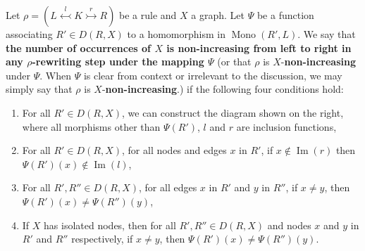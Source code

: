 \begin{definition}
    \label{subgraph_counting:def:creates_more_x_on_the_left}
    Let \(\rho = (L \overset{l}{\leftarrowtail} K \overset{r}{\rightarrowtail} R)\) be a rule and \(X\) a graph. 
    Let \( \Psi \) be a function associating $R' \in D(R,X)$ to a homomorphism in $\operatorname{Mono}(R',L)$.
    We say that \textbf{the number of occurrences of $X$ is non-increasing from left to right in any $\rho$-rewriting step under the mapping \(\Psi\)}
    (or that $\rho$ is $X$-\textbf{non-increasing} under $\Psi$. When $\Psi$ is clear from context or irrelevant to the discussion, we may simply say that $\rho$ is $X$-\textbf{non-increasing}.)
    if the following four conditions hold:
    \newline
    \vspace{1mm}
    \noindent
    \begin{minipage}{0.64\textwidth} 
    \begin{enumerate}
        \item For all $R' \in D(R,X)$, we can construct the diagram shown on the right, where all morphisms other than $\Psi(R')$, $l$ and $r$ are inclusion functions,
        \item \label{def:non_increasing:non_clapse} For all $R' \in D(R,X)$, for all nodes and edges $x$ in $R'$, if $ x \notin \operatorname{Im}(r)$ then 
        $\Psi(R')(x) \notin \operatorname{Im}(l)$,
        \item \label{def:non_increasing_rule_img_edges_distinct} For all $R',R'' \in D(R,X)$, for all edges $x$ in $R'$ and $y$ in $R''$, if $x \neq y$, then $\Psi(R')(x) \neq \Psi(R'')(y)$,
        \item If $X$ has isolated nodes, then for all $R',R'' \in D(R,X)$ and nodes $x$ and $y$ in $R'$ and $R''$ respectively, if $x \neq y$, then $\Psi(R')(x) \neq \Psi(R'')(y)$.
    \end{enumerate} 

\end{minipage}
\end{definition}
